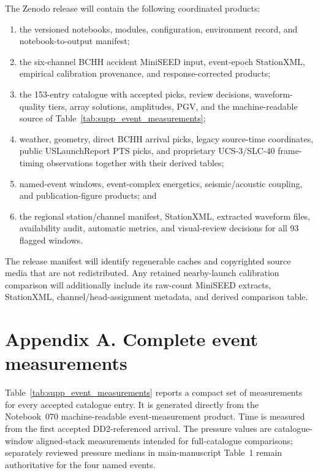 \documentclass[]{seismica}
\begin{document}
The Zenodo release will contain the following coordinated products:
\begin{enumerate}
  \item the versioned notebooks, modules, configuration, environment record,
        and notebook-to-output manifest;
  \item the six-channel BCHH accident MiniSEED input, event-epoch StationXML,
        empirical calibration provenance, and response-corrected products;
  \item the 153-entry catalogue with accepted picks, review decisions,
        waveform-quality tiers, array solutions, amplitudes, PGV, and the
        machine-readable source of Table~\ref{tab:supp_event_measurements};
  \item weather, geometry, direct BCHH arrival picks, legacy source-time coordinates, public USLaunchReport PTS picks, and proprietary UCS-3/SLC-40 frame-timing observations together with
        their derived tables;
  \item named-event windows, event-complex energetics, seismic/acoustic coupling, and
        publication-figure products; and
  \item the regional station/channel manifest, StationXML, extracted waveform
        files, availability audit, automatic metrics, and visual-review
        decisions for all 93 flagged windows.
\end{enumerate}
The release manifest will identify regenerable caches and copyrighted source
media that are not redistributed. Any retained nearby-launch calibration
comparison will additionally include its raw-count MiniSEED extracts,
StationXML, channel/head-assignment metadata, and derived comparison table.

\clearpage

\section*{Appendix A. Complete event measurements}
\label{app:supp_event_measurements}

Table~\ref{tab:supp_event_measurements} reports a compact set of measurements
for every accepted catalogue entry. It is generated directly from the
Notebook~070 machine-readable event-measurement product. Time is measured from
the first accepted DD2-referenced arrival. The pressure values are
catalogue-window aligned-stack measurements intended for full-catalogue
comparisons; separately reviewed pressure medians in main-manuscript Table~1
remain authoritative for the four named events.
\end{document}
